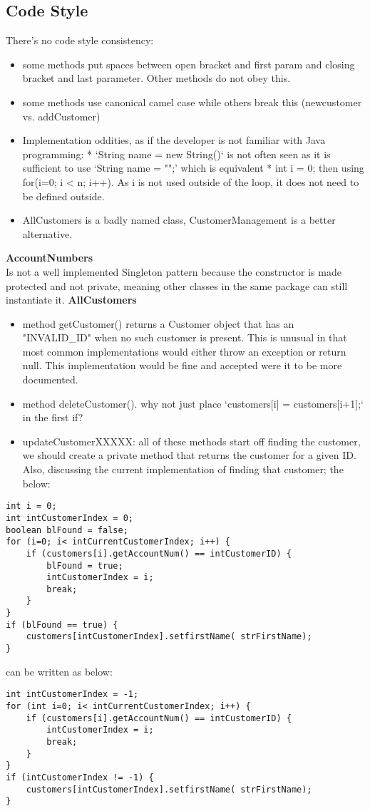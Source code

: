 \subsection{Code Style}
There's no code style consistency: 
\begin{itemize}
	\item some methods put spaces between open bracket and first param and closing bracket and last parameter. Other methods do not obey this. 
	\item some methods use canonical camel case while others break this (newcustomer vs. addCustomer)
	\item Implementation oddities, as if the developer is not familiar with Java programming: 
		* `String name = new String()` is not often seen as it is sufficient to use `String name = "";' which is equivalent
		* int i = 0; then using for(i=0; i < n; i++). As i is not used outside of the loop, it does not need to be defined outside. 
	\item AllCustomers is a badly named class, CustomerManagement is a better alternative. 
\end{itemize}
\textbf{AccountNumbers\\}
Is not a well implemented Singleton pattern because the constructor is made protected and not private, meaning other classes in the same package can still instantiate it.
\textbf{AllCustomers}
\begin{itemize}
	\item method getCustomer() returns a Customer object that has an "INVALID\_ID" when no such customer is present. This is unusual in that most common implementations would either throw an exception or return null. This implementation would be fine and accepted were it to be more documented. 

	\item method deleteCustomer(). why not just place `customers[i] = customers[i+1];` in the first if? 

	\item updateCustomerXXXXX: all of these methods start off finding the customer, we should create a private method that returns the customer for a given ID. Also, discussing the current implementation of finding that customer; the below: 
\end{itemize}

\begin{verbatim}
int i = 0;
int intCustomerIndex = 0;
boolean blFound = false;
for (i=0; i< intCurrentCustomerIndex; i++) {
	if (customers[i].getAccountNum() == intCustomerID) {
		blFound = true;
		intCustomerIndex = i;
		break;
	}
}
if (blFound == true) {
	customers[intCustomerIndex].setfirstName( strFirstName);
}
\end{verbatim}
can be written as below: 
\begin{verbatim}
int intCustomerIndex = -1;
for (int i=0; i< intCurrentCustomerIndex; i++) {
	if (customers[i].getAccountNum() == intCustomerID) {
		intCustomerIndex = i;
		break;
	}
}
if (intCustomerIndex != -1) {
	customers[intCustomerIndex].setfirstName( strFirstName);
}
\end{verbatim}

